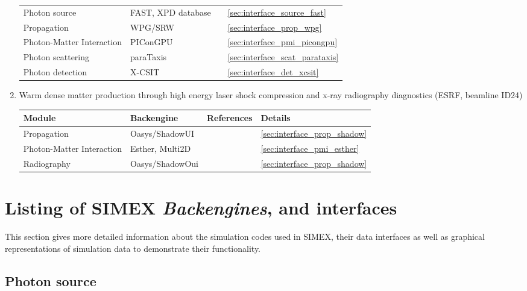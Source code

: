\documentclass[12pt]{scrartcl}
\begin{document}
\begin{enumerate}
{\begin{tabular}{l|l|l|l}
      \hline
      Photon source &  FAST, XPD database &
      \cite{Saldin1999,xpd_xfel} & \ref{sec:interface_source_fast} \\
      Propagation &  WPG/SRW &
      \cite{Samoylova2016, wpg_github} & \ref{sec:interface_prop_wpg} \\
      Photon-Matter Interaction & PIConGPU
      & \cite{Bussmann2013} & \ref{sec:interface_pmi_picongpu} \\
      Photon scattering &  paraTaxis & \cite{Kluge2016b} &
      \ref{sec:interface_scat_parataxis} \\
      Photon detection &  X-CSIT & \cite{Joy2015} &
      \ref{sec:interface_det_xcsit} \\
      \hline
      \hline
    \end{tabular}
  }

  \item Warm dense matter production through high energy laser shock compression
    and x-ray radiography diagnostics (ESRF, beamline ID24)\label{baseline_application_wdm}\\
    {\scriptsize%
    \begin{tabular}{l|l|l|l}
      \hline
      \hline
      \textbf{Module} & \textbf{Backengine}
      & \textbf{References} & \textbf{Details} \\
      \hline
      Propagation &  Oasys/ShadowUI &
      \cite{Rio2014} & \ref{sec:interface_prop_shadow}\\
      Photon-Matter Interaction & Esther, Multi2D
      & \cite{Colombier2005, Ramis2009} & \ref{sec:interface_pmi_esther} \\
      Radiography & Oasys/ShadowOui & \cite{Rio2014} &
      \ref{sec:interface_prop_shadow} \\
      \hline
      \hline
    \end{tabular}
  }

\end{enumerate}
%
\section{Listing of SIMEX \textit{Backengines}, and interfaces}
This section gives more detailed information about the simulation codes used in
SIMEX, their data interfaces as well as graphical representations of simulation data to demonstrate their
functionality.
\subsection{Photon source }
\end{document}
